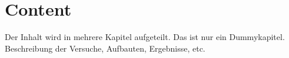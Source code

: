 \chapter{Content}

Der Inhalt wird in mehrere Kapitel aufgeteilt. Das ist nur ein Dummykapitel. Beschreibung der Versuche, Aufbauten, Ergebnisse, etc.

%
\lipsum[1-25]
